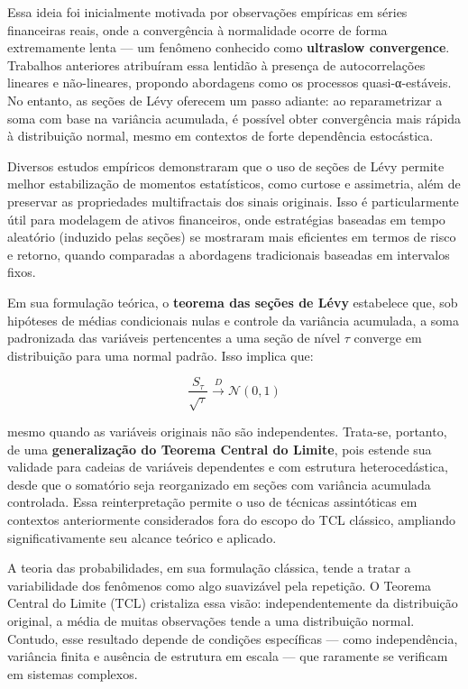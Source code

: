 \documentclass[
  portuguese,
]{agujournal2019}
\begin{document}
Essa ideia foi inicialmente motivada por observações empíricas em séries
financeiras reais, onde a convergência à normalidade ocorre de forma
extremamente lenta --- um fenômeno conhecido como \textbf{ultraslow
convergence}. Trabalhos anteriores atribuíram essa lentidão à presença
de autocorrelações lineares e não-lineares, propondo abordagens como os
processos quasi-α-estáveis. No entanto, as seções de Lévy oferecem um
passo adiante: ao reparametrizar a soma com base na variância acumulada,
é possível obter convergência mais rápida à distribuição normal, mesmo
em contextos de forte dependência estocástica.

Diversos estudos empíricos demonstraram que o uso de seções de Lévy
permite melhor estabilização de momentos estatísticos, como curtose e
assimetria, além de preservar as propriedades multifractais dos sinais
originais. Isso é particularmente útil para modelagem de ativos
financeiros, onde estratégias baseadas em tempo aleatório (induzido
pelas seções) se mostraram mais eficientes em termos de risco e retorno,
quando comparadas a abordagens tradicionais baseadas em intervalos
fixos.

Em sua formulação teórica, o \textbf{teorema das seções de Lévy}
estabelece que, sob hipóteses de médias condicionais nulas e controle da
variância acumulada, a soma padronizada das variáveis pertencentes a uma
seção de nível \(\tau\) converge em distribuição para uma normal padrão.
Isso implica que:

\[
\frac{S_\tau}{\sqrt{\tau}} \xrightarrow{D} \mathcal{N}(0, 1)
\]

mesmo quando as variáveis originais não são independentes. Trata-se,
portanto, de uma \textbf{generalização do Teorema Central do Limite},
pois estende sua validade para cadeias de variáveis dependentes e com
estrutura heterocedástica, desde que o somatório seja reorganizado em
seções com variância acumulada controlada. Essa reinterpretação permite
o uso de técnicas assintóticas em contextos anteriormente considerados
fora do escopo do TCL clássico, ampliando significativamente seu alcance
teórico e aplicado.

A teoria das probabilidades, em sua formulação clássica, tende a tratar
a variabilidade dos fenômenos como algo suavizável pela repetição. O
Teorema Central do Limite (TCL) cristaliza essa visão: independentemente
da distribuição original, a média de muitas observações tende a uma
distribuição normal. Contudo, esse resultado depende de condições
específicas --- como independência, variância finita e ausência de
estrutura em escala --- que raramente se verificam em sistemas
complexos.
\end{document}
